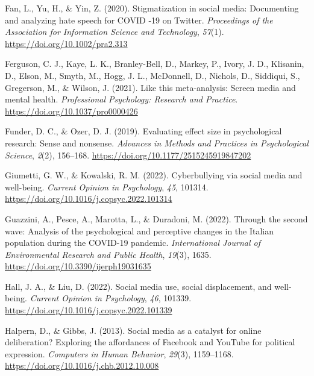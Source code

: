 \documentclass[
  man,mask,floatsintext]{apa7}
\newlength{\cslhangindent}
\newlength{\cslentryspacingunit} %
\newenvironment{CSLReferences}[2] %
 {%
  \setlength{\parindent}{0pt}
  \ifodd #1
  \let\oldpar\par
  \def\par{\hangindent=\cslhangindent\oldpar}
  \fi
  \setlength{\parskip}{#2\cslentryspacingunit}
 }%
 {}
\begin{document}
\begin{CSLReferences}{1}{0}
\leavevmode{}%
Fan, L., Yu, H., \& Yin, Z. (2020). Stigmatization in social media: {Documenting} and analyzing hate speech for {\textsc{COVID}} ‐19 on {Twitter}. \emph{Proceedings of the Association for Information Science and Technology}, \emph{57}(1). \url{https://doi.org/10.1002/pra2.313}

\leavevmode{}%
Ferguson, C. J., Kaye, L. K., Branley-Bell, D., Markey, P., Ivory, J. D., Klisanin, D., Elson, M., Smyth, M., Hogg, J. L., McDonnell, D., Nichols, D., Siddiqui, S., Gregerson, M., \& Wilson, J. (2021). Like this meta-analysis: {Screen} media and mental health. \emph{Professional Psychology: Research and Practice}. \url{https://doi.org/10.1037/pro0000426}

\leavevmode{}%
Funder, D. C., \& Ozer, D. J. (2019). Evaluating effect size in psychological research: {Sense} and nonsense. \emph{Advances in Methods and Practices in Psychological Science}, \emph{2}(2), 156--168. \url{https://doi.org/10.1177/2515245919847202}

\leavevmode{}%
Giumetti, G. W., \& Kowalski, R. M. (2022). Cyberbullying via social media and well-being. \emph{Current Opinion in Psychology}, \emph{45}, 101314. \url{https://doi.org/10.1016/j.copsyc.2022.101314}

\leavevmode{}%
Guazzini, A., Pesce, A., Marotta, L., \& Duradoni, M. (2022). Through the second wave: {Analysis} of the psychological and perceptive changes in the {Italian} population during the {COVID-19} pandemic. \emph{International Journal of Environmental Research and Public Health}, \emph{19}(3), 1635. \url{https://doi.org/10.3390/ijerph19031635}

\leavevmode{}%
Hall, J. A., \& Liu, D. (2022). Social media use, social displacement, and well-being. \emph{Current Opinion in Psychology}, \emph{46}, 101339. \url{https://doi.org/10.1016/j.copsyc.2022.101339}

\leavevmode{}%
Halpern, D., \& Gibbs, J. (2013). Social media as a catalyst for online deliberation? {Exploring} the affordances of {Facebook} and {YouTube} for political expression. \emph{Computers in Human Behavior}, \emph{29}(3), 1159--1168. \url{https://doi.org/10.1016/j.chb.2012.10.008}


\end{CSLReferences}
\end{document}
